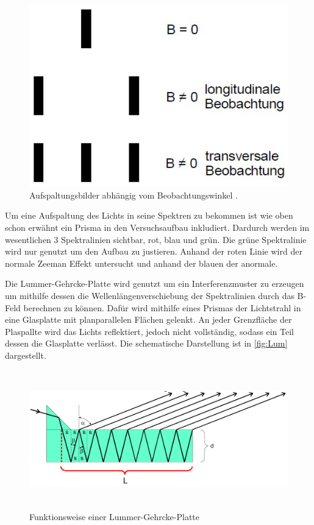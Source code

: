\vspace{-5pt}
\begin{figure}[H]
    \centering
    \includegraphics[scale=0.2]{polarisation.png}
    \vspace{-10pt}
    \vspace{3pt}
    \caption{Aufspaltungsbilder abhängig vom Beobachtungswinkel \cite{V27}.}
    \label{fig:pol}
\end{figure}

\noindent
Um eine Aufspaltung des Lichts in seine Spektren zu bekommen ist wie oben schon erwähnt ein Prisma in den Versuchsaufbau inkludiert. Dardurch werden im wesentlichen 3 Spektralinien
sichtbar, rot, blau und grün. Die grüne Spektralinie wird nur genutzt um den Aufbau zu justieren. Anhand der roten Linie wird der normale Zeeman Effekt untersucht und anhand der 
blauen der anormale.  


\noindent
Die Lummer-Gehrcke-Platte wird genutzt um ein Interferenzmuster zu erzeugen um mithilfe dessen die Wellenlängenverschiebung der Spektralinien durch das B-Feld berechnen zu können.
Dafür wird mithilfe eines Prismas der Lichtstrahl in eine Glasplatte mit planparallelen Flächen gelenkt. An jeder Grenzfläche der Plaspallte wird das Lichts reflektiert, jedoch nicht
vollständig, sodass ein Teil dessen die Glasplatte verlässt. Die schematische Darstellung ist in \autoref{fig:Lum} dargestellt.

\begin{figure}[H]
  \centering
  \includegraphics[height=6cm]{Lummer.png}
  \caption{Funktionsweise einer Lummer-Gehrcke-Platte \cite{V27}}
  \label{fig:Lum}
\end{figure}

